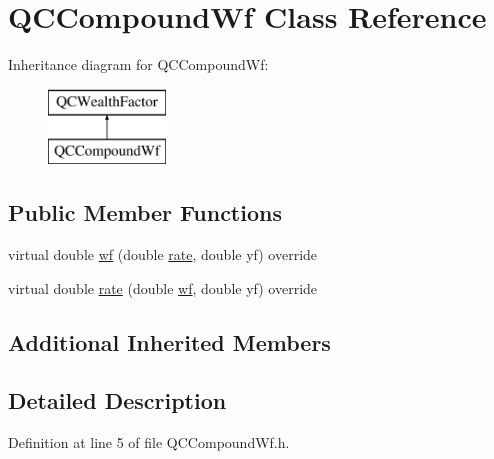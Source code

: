 \hypertarget{class_q_c_compound_wf}{\section{Q\+C\+Compound\+Wf Class Reference}
\label{class_q_c_compound_wf}
}
Inheritance diagram for Q\+C\+Compound\+Wf\+:\begin{figure}[H]
\begin{center}
\leavevmode
\includegraphics[height=2.000000cm]{class_q_c_compound_wf}
\end{center}
\end{figure}
\subsection*{Public Member Functions}
\begin{DoxyCompactItemize}
\item 
virtual double \hyperlink{class_q_c_compound_wf_a96e3c92f84af47a241a4e24ad470536a}{wf} (double \hyperlink{class_q_c_compound_wf_a49832a3141f59a281e1ccc8396724bb8}{rate}, double yf) override
\item 
virtual double \hyperlink{class_q_c_compound_wf_a49832a3141f59a281e1ccc8396724bb8}{rate} (double \hyperlink{class_q_c_compound_wf_a96e3c92f84af47a241a4e24ad470536a}{wf}, double yf) override
\end{DoxyCompactItemize}
\subsection*{Additional Inherited Members}


\subsection{Detailed Description}


Definition at line 5 of file Q\+C\+Compound\+Wf.\+h.



